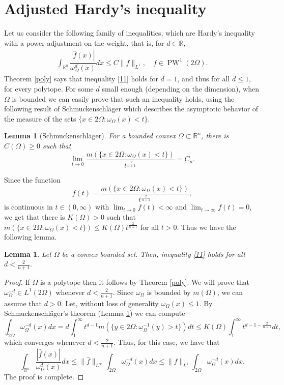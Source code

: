 \documentclass[footinclude=true]{amsart}
\theoremstyle{plain}
\newtheorem{lm}[theo]{Lemma}
\DeclareMathOperator{\PW}{PW}
\begin{document}
	\section{Adjusted Hardy's inequality}\label{sec4}
	Let us consider the following family of inequalities, which are Hardy's inequality with a power adjustment on the weight, that is, for $d\in\mathbb{R}$,
	\begin{eqnarray}\label{11} \int_{\mathbb{R}^{n}}\dfrac{|\widehat{f}(x)|}{\omega_{\Omega}^d(x)}dx\leq C\|f\|_{L^{1}}, \quad f\in\PW^{1}(2\Omega).
	\end{eqnarray} 
	Theorem \ref{poly} says that inequality \eqref{11} holds for $d=1$, and thus for all $d\leq 1$, for every polytope. For some $d$ small enough (depending on the dimension), when $\Omega$ is bounded we can easily prove that such an inequality holds, using the following result of Schmuckenschl\"{a}ger \cite[Theorem 2]{MR1194970} which describes the asymptotic behavior of the measure of the sets $\{x\in 2\Omega:\omega_{\Omega}(x)<t\}$.
	\begin{lm}[Schmuckenschl\"{a}ger]\label{schm} For a bounded convex $\Omega\subset\mathbb{R}^{n}$, there is $C(\Omega)\geq 0$ such that 
     $$\lim_{t\to 0}\dfrac{m(\{x\in 2\Omega:\omega_{\Omega}(x)<t\})}{t^{\frac{2}{n+1}}}=C_n.$$
	\end{lm}
	Since the function $$f(t)=\dfrac{m(\{x\in 2\Omega:\omega_{\Omega}(x)<t\})}{t^{\frac{2}{n+1}}},$$ is continuous in $t\in (0,\infty)$ with $\lim_{t\to 0}f(t)<\infty$ and $\lim_{t\to \infty}f(t)=0$, we get that there is $K(\Omega)>0$ such that $m(\{x\in 2\Omega:\omega_{\Omega}(x)<t\})\leq K(\Omega)t^{\frac{2}{n+1}}$ for all $t>0$. Thus we have the following lemma.
	\begin{lm}\label{hold}
		Let $\Omega$ be a convex bounded set. Then, inequality \eqref{11} holds for all $d<\frac{2}{n+1}$.
	\end{lm}
	\begin{proof}
		If $\Omega$ is a polytope then it follows by Theorem \ref{poly}. We will prove that $\omega_{\Omega}^{-d}\in L^{1}(2\Omega)$ whenever $d<\frac{2}{n+1}$. Since $\omega_{\Omega}$ is bounded by $m(\Omega)$, we can assume that $d>0$. Let, without loss of generality $\omega_{\Omega}(x)\leq 1$. By Schmuckenschl\"{a}ger's theorem (Lemma \ref{schm}) we can compute
			$$\int_{2\Omega}\omega_{\Omega}^{-d}(x)dx= d\int_{1}^{\infty}t^{d-1}m(\{y\in 2\Omega:\omega_{\Omega}^{-1}(y)>t\})dt \leq K(\Omega)\int_{1}^{\infty}t^{d-1-\frac{2}{n+1}}dt,$$
	which converges whenever $d<\frac{2}{n+1}$. Thus, for this case, we have that 
		$$\int_{\mathbb{R}^n}\dfrac{|\widehat{f}(x)|}{\omega_{\Omega}^d(x)}dx\leq \|\widehat{f}\|_{L^{\infty}}\int_{2\Omega}\omega_{\Omega}^{-d}(x)dx\leq \|f\|_{L^{1}}\int_{2\Omega}\omega_{\Omega}^{-d}(x)dx.$$ The proof is complete.
	\end{proof}
\end{document}
